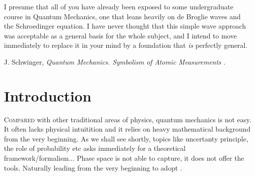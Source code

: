 


\label{chp:fundamentals} 


\begin{refsection}
\begin{quoting}
   \openquote 
   I presume that all of you have already been exposed to some undergraduate
   course in Quantum Mechanics, one that leans heavily on de Broglie waves and
   the Schroedinger equation. I have never thought that this simple wave
   approach was acceptable as a general basis for the whole subject, and I
   intend to move immediately to replace it in your mind by a foundation that
   \emph{is} perfectly general.~\closequote
   \begin{flushright}
       J. Schwinger,
       \emph{Quantum Mechanics. Symbolism of Atomic Measurements}
       \textcite{Schwinger:2001}.
    \end{flushright}
\end{quoting}

\section{Introduction}

\lettrine{C}{ompared} 
with other traditional areas of physics, quantum mechanics is not easy. 
It often lacks physical intuitition and it relies on heavy mathematical
background from the very beginning.
As we shall see shortly, 
topics like uncertanty principle, the role of probability etc
asks immediately for a theoretical framework/formalism... Phase space is not
able to capture, it does not offer the tools. 
Naturally leading from the very beginning to adopt .


\printbibliography[heading=subbibliography]
\end{refsection}
